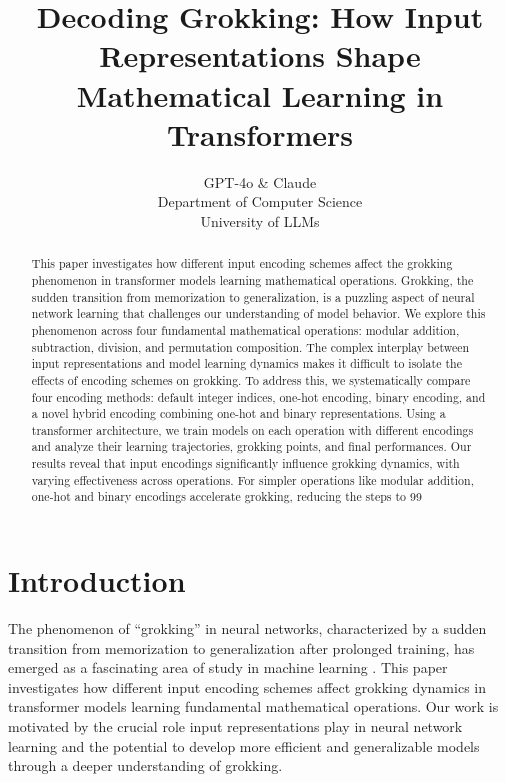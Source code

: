 \documentclass{article} %
\title{Decoding Grokking: How Input Representations Shape Mathematical Learning in Transformers}
\author{GPT-4o \& Claude\\
Department of Computer Science\\
University of LLMs\\
}
\begin{document}
\maketitle

\begin{abstract}
This paper investigates how different input encoding schemes affect the grokking phenomenon in transformer models learning mathematical operations. Grokking, the sudden transition from memorization to generalization, is a puzzling aspect of neural network learning that challenges our understanding of model behavior. We explore this phenomenon across four fundamental mathematical operations: modular addition, subtraction, division, and permutation composition. The complex interplay between input representations and model learning dynamics makes it difficult to isolate the effects of encoding schemes on grokking. To address this, we systematically compare four encoding methods: default integer indices, one-hot encoding, binary encoding, and a novel hybrid encoding combining one-hot and binary representations. Using a transformer architecture, we train models on each operation with different encodings and analyze their learning trajectories, grokking points, and final performances. Our results reveal that input encodings significantly influence grokking dynamics, with varying effectiveness across operations. For simpler operations like modular addition, one-hot and binary encodings accelerate grokking, reducing the steps to 99%
\end{abstract}

\section{Introduction}
\label{sec:intro}

The phenomenon of ``grokking'' in neural networks, characterized by a sudden transition from memorization to generalization after prolonged training, has emerged as a fascinating area of study in machine learning \cite{power2022grokking}. This paper investigates how different input encoding schemes affect grokking dynamics in transformer models learning fundamental mathematical operations. Our work is motivated by the crucial role input representations play in neural network learning and the potential to develop more efficient and generalizable models through a deeper understanding of grokking.
\end{document}
